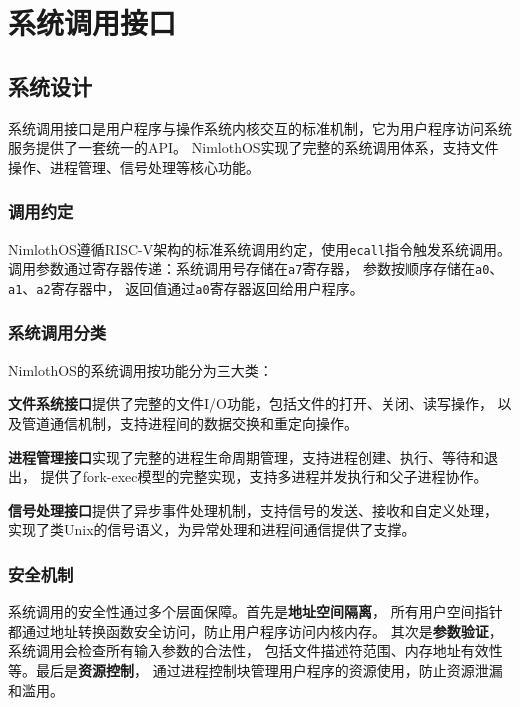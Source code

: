 \chapter{系统调用接口}

\section{系统设计}

系统调用接口是用户程序与操作系统内核交互的标准机制，它为用户程序访问系统服务提供了一套统一的API。
NimlothOS实现了完整的系统调用体系，支持文件操作、进程管理、信号处理等核心功能。

\subsection{调用约定}

NimlothOS遵循RISC-V架构的标准系统调用约定，使用\texttt{ecall}指令触发系统调用。
调用参数通过寄存器传递：系统调用号存储在\texttt{a7}寄存器，
参数按顺序存储在\texttt{a0}、\texttt{a1}、\texttt{a2}寄存器中，
返回值通过\texttt{a0}寄存器返回给用户程序。

\subsection{系统调用分类}

NimlothOS的系统调用按功能分为三大类：

\textbf{文件系统接口}提供了完整的文件I/O功能，包括文件的打开、关闭、读写操作，
以及管道通信机制，支持进程间的数据交换和重定向操作。

\textbf{进程管理接口}实现了完整的进程生命周期管理，支持进程创建、执行、等待和退出，
提供了fork-exec模型的完整实现，支持多进程并发执行和父子进程协作。

\textbf{信号处理接口}提供了异步事件处理机制，支持信号的发送、接收和自定义处理，
实现了类Unix的信号语义，为异常处理和进程间通信提供了支撑。

\subsection{安全机制}

系统调用的安全性通过多个层面保障。首先是\textbf{地址空间隔离}，
所有用户空间指针都通过地址转换函数安全访问，防止用户程序访问内核内存。
其次是\textbf{参数验证}，系统调用会检查所有输入参数的合法性，
包括文件描述符范围、内存地址有效性等。最后是\textbf{资源控制}，
通过进程控制块管理用户程序的资源使用，防止资源泄漏和滥用。

